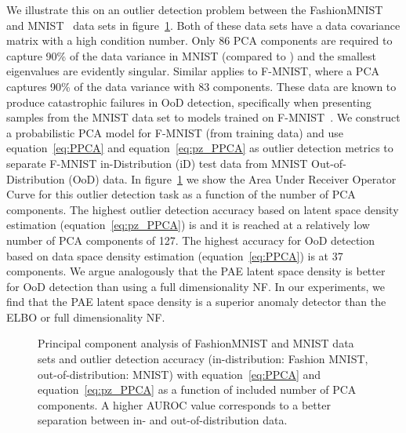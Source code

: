\documentclass[10pt]{article} \usepackage[accepted]{tmlr}
\newcommand{\rev}[1]{{\color{black}#1}}
\begin{document}
We illustrate this on an outlier detection problem between the FashionMNIST~\citep{f-mnist} and MNIST~\citep{LecunMNIST} data sets in figure~\ref{fig:PPCA}. Both of these data sets have a data covariance matrix with a high condition number. Only 86 PCA components are required to capture 90\% of the data variance in MNIST (compared to ) and the smallest eigenvalues are evidently singular. Similar applies to F-MNIST, where a PCA captures 90\% of the data variance with 83 components. 
These data are known to produce catastrophic failures in OoD detection, specifically when presenting samples from the MNIST data set to models trained on F-MNIST~\citep{Nalisnick2019}.
We construct a probabilistic PCA model for F-MNIST (from training data) and use equation~\ref{eq:PPCA} and equation~\ref{eq:pz_PPCA} as outlier detection metrics to separate F-MNIST in-Distribution (iD) test data from MNIST Out-of-Distribution (OoD) data. In figure~\ref{fig:PPCA} we show the Area Under Receiver Operator Curve for this outlier detection task as a function of the number of PCA components. The highest outlier detection accuracy based on latent space density estimation (equation~\ref{eq:pz_PPCA}) is  and it is reached at a relatively low number of PCA components of 127. The highest accuracy for OoD detection based on data space density estimation (equation~\ref{eq:PPCA}) is  at 37 components.
\rev{We argue analogously that the PAE latent space density is better for OoD detection than using a full dimensionality NF.}
In our experiments, we find that the PAE latent space density is a superior anomaly detector than the ELBO \rev{ or full dimensionality NF}. 

\begin{figure}
\caption{\label{fig:PPCA} Principal component analysis of FashionMNIST and MNIST data sets and outlier detection accuracy (in-distribution: Fashion MNIST, out-of-distribution: MNIST) with equation~\ref{eq:PPCA} and equation~\ref{eq:pz_PPCA} as a function of included number of PCA components. A higher AUROC value corresponds to a better separation between in- and out-of-distribution data.}
\end{figure}
\end{document}
